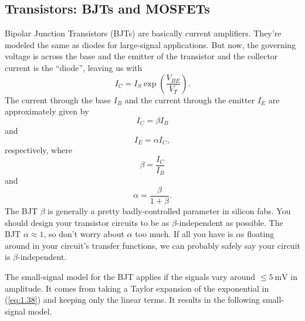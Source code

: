 \subsection{Transistors: BJTs and MOSFETs}
Bipolar Junction Transistors (BJTs) are basically current amplifiers. They're modeled the same as diodes for large-signal applications. But now, the governing voltage is across the base and the emitter of the transistor and the collector current is the ``diode'', leaving us with
\begin{equation}
\label{eq:1.38}
I_{C} = I_{S} \exp \left( \frac{V_{BE}}{V_{T}} \right).
\end{equation}
The current through the base $I_{B}$ and the current through the emitter $I_{E}$ are approximately given by
\begin{equation}
  \label{eq:1.39}
  I_{C} = \beta I_{B}
\end{equation}
and
\begin{equation}
  \label{eq:1.40}
  I_{E} = \alpha I_{C},
\end{equation}
respectively, where
\begin{equation}
\label{eq:1.41}
\beta = \frac{I_{C}}{I_{B}}
\end{equation}
and
\begin{equation}
\label{eq:1.42}
\alpha = \frac{ \beta }{ 1 + \beta }.
\end{equation}
The BJT $\beta$ is generally a pretty badly-controlled parameter in silicon fabs. You should design your transistor circuits to be as $\beta$-independent as possible. The BJT $\alpha \approx 1$, so don't worry about $\alpha$ too much. If all you have is $\alpha$s floating around in your circuit's transfer functions, we can probably safely say your circuit is $\beta$-independent.

The small-signal model for the BJT applies if the signals vary around $\leq \SI{5}{\mV}$ in amplitude. It comes from taking a Taylor expansion of the exponential in (\ref{eq:1.38}) and keeping only the linear terms. It results in the following small-signal model. 

